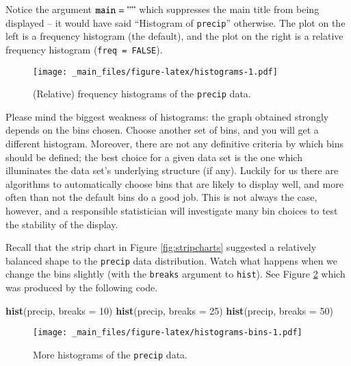 \documentclass[]{book}
\newenvironment{Shaded}{\begin{snugshade}}{\end{snugshade}}
\newcommand{\KeywordTok}[1]{\textcolor[rgb]{0.13,0.29,0.53}{\textbf{{#1}}}}
\newcommand{\DataTypeTok}[1]{\textcolor[rgb]{0.13,0.29,0.53}{{#1}}}
\newcommand{\DecValTok}[1]{\textcolor[rgb]{0.00,0.00,0.81}{{#1}}}
\newcommand{\NormalTok}[1]{{#1}}
\numberwithin{equation}{chapter}
\numberwithin{figure}{chapter}
\theoremstyle{plain}
\theoremstyle{definition}
\theoremstyle{remark}
\theoremstyle{definition}
\theoremstyle{definition}
\theoremstyle{remark}
\begin{document}
Notice the argument \(\mathtt{main = ""}\) which suppresses the main
title from being displayed -- it would have said ``Histogram of
\texttt{precip}'' otherwise. The plot on the left is a frequency
histogram (the default), and the plot on the right is a relative
frequency histogram (\texttt{freq\ =\ FALSE}).

\begin{figure}[htbp]
\centering
\texttt{[image: \_main\_files/figure-latex/histograms-1.pdf]}
\caption{\label{fig:histograms}\small (Relative) frequency histograms of the
\texttt{precip} data.}
\end{figure}




Please mind the biggest weakness of histograms: the graph obtained
strongly depends on the bins chosen. Choose another set of bins, and you
will get a different histogram. Moreover, there are not any definitive
criteria by which bins should be defined; the best choice for a given
data set is the one which illuminates the data set's underlying
structure (if any). Luckily for us there are algorithms to automatically
choose bins that are likely to display well, and more often than not the
default bins do a good job. This is not always the case, however, and a
responsible statistician will investigate many bin choices to test the
stability of the display.

Recall that the strip chart in Figure \ref{fig:stripcharts} suggested a
relatively balanced shape to the \texttt{precip} data distribution.
Watch what happens when we change the bins slightly (with the
\texttt{breaks} argument to \texttt{hist}). See Figure
\ref{fig:histograms-bins} which was produced by the following code.

\begin{Shaded}
\begin{Highlighting}[]
\KeywordTok{hist}\NormalTok{(precip, }\DataTypeTok{breaks =} \DecValTok{10}\NormalTok{)}
\KeywordTok{hist}\NormalTok{(precip, }\DataTypeTok{breaks =} \DecValTok{25}\NormalTok{)}
\KeywordTok{hist}\NormalTok{(precip, }\DataTypeTok{breaks =} \DecValTok{50}\NormalTok{)}
\end{Highlighting}
\end{Shaded}

\begin{figure}[htbp]
\centering
\texttt{[image: \_main\_files/figure-latex/histograms-bins-1.pdf]}
\caption{\label{fig:histograms-bins}\small More histograms of the \texttt{precip}
data.}
\end{figure}
\end{document}
